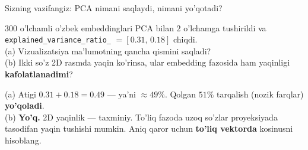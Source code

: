 \documentclass[aspectratio=169,11pt]{beamer}
\begin{document}
\begin{frame}{Sizning vazifangiz: PCA nimani saqlaydi, nimani yo'qotadi?}
  \begin{tcolorbox}[warnbox,title=Savol --- 90 soniya]
    \small
    $300$ o'lchamli o'zbek embeddinglari PCA bilan $2$ o'lchamga
    tushirildi va \texttt{explained\_variance\_ratio\_} $=[0.31,\,0.18]$
    chiqdi.\\[5pt]
    (a) Vizualizatsiya ma'lumotning qancha qismini saqladi?\\
    (b) Ikki so'z 2D rasmda yaqin ko'rinsa, ular embedding fazosida
        ham yaqinligi \textbf{kafolatlanadimi}?
  \end{tcolorbox}
  \pause
  \begin{tcolorbox}[okbox,title=Javob]
    \small
    (a) Atigi $0.31 + 0.18 = \mathbf{0.49}$ --- ya'ni $\approx 49\%$.
    Qolgan $51\%$ tarqalish (nozik farqlar) \textbf{yo'qoladi}.\\[3pt]
    (b) \textbf{Yo'q.} 2D yaqinlik --- taxminiy. To'liq fazoda uzoq
    so'zlar proyeksiyada tasodifan yaqin tushishi mumkin. Aniq
    qaror uchun \textbf{to'liq vektorda} kosinusni hisoblang.
  \end{tcolorbox}
\end{frame}
\end{document}
